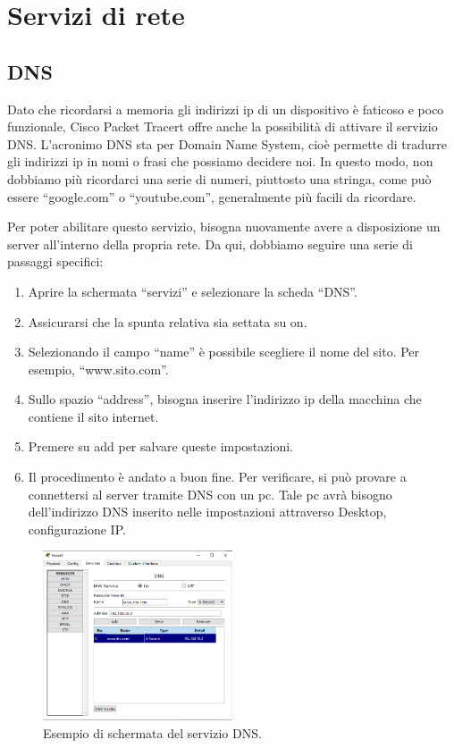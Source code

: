 \section{Servizi di rete}
\subsection{DNS}
Dato che ricordarsi a memoria gli indirizzi ip di un dispositivo è faticoso e poco funzionale, Cisco Packet Tracert offre anche la possibilità di attivare il servizio DNS. L’acronimo DNS sta per Domain Name System, cioè permette di tradurre gli indirizzi ip in nomi o frasi che possiamo decidere noi. In questo modo, non dobbiamo più ricordarci una serie di numeri, piuttosto una stringa, come può essere “google.com” o “youtube.com”, generalmente più facili da ricordare.

Per poter abilitare questo servizio, bisogna nuovamente avere a disposizione un server all’interno della propria rete. Da qui, dobbiamo seguire una serie di passaggi specifici:

\begin{enumerate}
    \item Aprire la schermata “servizi” e selezionare la scheda “DNS”.
    \item Assicurarsi che la spunta relativa sia settata su on.
    \item Selezionando il campo “name” è possibile scegliere il nome del sito. Per esempio, “www.sito.com”.
    \item Sullo spazio “address”, bisogna inserire l’indirizzo ip della macchina che contiene il sito internet.
    \item Premere su add per salvare queste impostazioni.
    \item Il procedimento è andato a buon fine. Per verificare, si può provare a connettersi al server tramite DNS con un pc. Tale pc avrà bisogno dell’indirizzo DNS inserito nelle impostazioni attraverso Desktop, configurazione IP.
\end{enumerate}

\begin{figure}[h]
    \centering
    \includegraphics[width=0.5\textwidth]{images/06.01.01.png}
    \caption{Esempio di schermata del servizio DNS.}
    \label{fig:dns-conf-server}
\end{figure}

